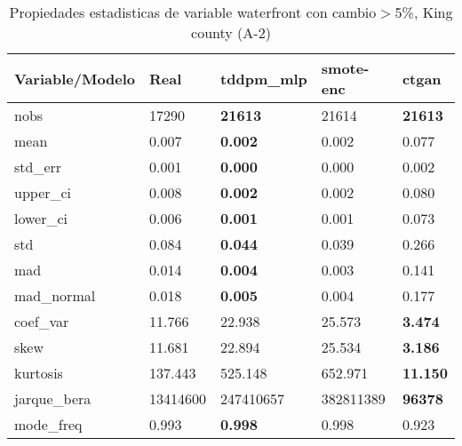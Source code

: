 \begin{table}[H]
\centering
\fontsize{8}{14}\selectfont
\caption{Propiedades estadisticas de variable waterfront con cambio\ensuremath{>}5\%, King county (A-2)}
\label{table-stats-king county-a-2-waterfront-short}
\begin{tabular}{|l|m{10em}|m{10em}|m{10em}|m{10em}|}
\hline
 \rowcolor[gray]{0.8}
Variable/Modelo & Real & tddpm\_mlp & smote-enc & ctgan \\
\hline nobs & 17290 & \bfseries 21613 & \cellcolor[rgb]{0.9, 0.54, 0.52} 21614 & \bfseries 21613 \\
\hline mean & 0.007 & \bfseries 0.002 & 0.002 & \cellcolor[rgb]{0.9, 0.54, 0.52} 0.077 \\
\hline std\_err & 0.001 & \bfseries 0.000 & 0.000 & \cellcolor[rgb]{0.9, 0.54, 0.52} 0.002 \\
\hline upper\_ci & 0.008 & \bfseries 0.002 & 0.002 & \cellcolor[rgb]{0.9, 0.54, 0.52} 0.080 \\
\hline lower\_ci & 0.006 & \bfseries 0.001 & 0.001 & \cellcolor[rgb]{0.9, 0.54, 0.52} 0.073 \\
\hline std & 0.084 & \bfseries 0.044 & 0.039 & \cellcolor[rgb]{0.9, 0.54, 0.52} 0.266 \\
\hline mad & 0.014 & \bfseries 0.004 & 0.003 & \cellcolor[rgb]{0.9, 0.54, 0.52} 0.141 \\
\hline mad\_normal & 0.018 & \bfseries 0.005 & 0.004 & \cellcolor[rgb]{0.9, 0.54, 0.52} 0.177 \\
\hline coef\_var & 11.766 & 22.938 & \cellcolor[rgb]{0.9, 0.54, 0.52} 25.573 & \bfseries 3.474 \\
\hline skew & 11.681 & 22.894 & \cellcolor[rgb]{0.9, 0.54, 0.52} 25.534 & \bfseries 3.186 \\
\hline kurtosis & 137.443 & 525.148 & \cellcolor[rgb]{0.9, 0.54, 0.52} 652.971 & \bfseries 11.150 \\
\hline jarque\_bera & 13414600 & 247410657 & \cellcolor[rgb]{0.9, 0.54, 0.52} 382811389 & \bfseries 96378 \\
\hline mode\_freq & 0.993 & \bfseries 0.998 & 0.998 & \cellcolor[rgb]{0.9, 0.54, 0.52} 0.923 \\
\hline
\end{tabular}
\end{table}
